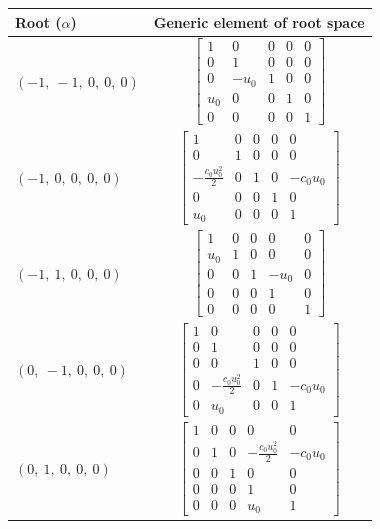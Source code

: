 \documentclass[11pt]{article}
\theoremstyle{definition}
\begin{document}
\noindent \begin{tabular}{|l|c|}
    \hline
    \textbf{Root ($\alpha$)} & \textbf{Generic element of root space} \\
    \hline
    $\left( -1, \  -1, \  0, \  0, \  0\right)$ & $\left[\begin{matrix}1 & 0 & 0 & 0 & 0\\0 & 1 & 0 & 0 & 0\\0 & - u_{0} & 1 & 0 & 0\\u_{0} & 0 & 0 & 1 & 0\\0 & 0 & 0 & 0 & 1\end{matrix}\right]$ \\
    \hline
    $\left( -1, \  0, \  0, \  0, \  0\right)$ & $\left[\begin{matrix}1 & 0 & 0 & 0 & 0\\0 & 1 & 0 & 0 & 0\\- \frac{c_{0} u_{0}^{2}}{2} & 0 & 1 & 0 & - c_{0} u_{0}\\0 & 0 & 0 & 1 & 0\\u_{0} & 0 & 0 & 0 & 1\end{matrix}\right]$ \\
    \hline
    $\left( -1, \  1, \  0, \  0, \  0\right)$ & $\left[\begin{matrix}1 & 0 & 0 & 0 & 0\\u_{0} & 1 & 0 & 0 & 0\\0 & 0 & 1 & - u_{0} & 0\\0 & 0 & 0 & 1 & 0\\0 & 0 & 0 & 0 & 1\end{matrix}\right]$ \\
    \hline
    $\left( 0, \  -1, \  0, \  0, \  0\right)$ & $\left[\begin{matrix}1 & 0 & 0 & 0 & 0\\0 & 1 & 0 & 0 & 0\\0 & 0 & 1 & 0 & 0\\0 & - \frac{c_{0} u_{0}^{2}}{2} & 0 & 1 & - c_{0} u_{0}\\0 & u_{0} & 0 & 0 & 1\end{matrix}\right]$ \\
    \hline
    $\left( 0, \  1, \  0, \  0, \  0\right)$ & $\left[\begin{matrix}1 & 0 & 0 & 0 & 0\\0 & 1 & 0 & - \frac{c_{0} u_{0}^{2}}{2} & - c_{0} u_{0}\\0 & 0 & 1 & 0 & 0\\0 & 0 & 0 & 1 & 0\\0 & 0 & 0 & u_{0} & 1\end{matrix}\right]$ \\

\end{tabular}
\end{document}

